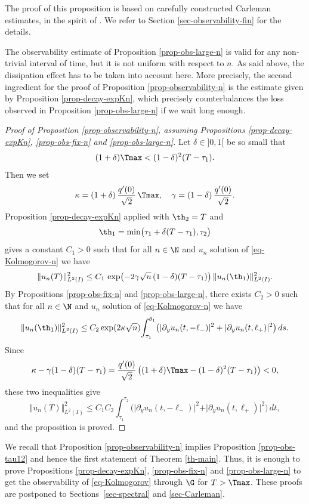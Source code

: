 The proof of this proposition is based on carefully constructed Carleman estimates, in the spirit of \cite{Beauchard_Darde_Ervedoza}. We refer to Section \ref{sec-observability-fin} for the details.

The observability estimate of Proposition \ref{prop-obs-large-n} is valid for any non-trivial interval of time, but it is not uniform with respect to $n$. As said above, the dissipation effect has to be taken into account here. More precisely, the second ingredient for the proof of Proposition \ref{prop-observability-n} is the estimate given by Proposition \ref{prop-decay-expKn}, which precisely counterbalances the loss observed in Proposition \ref{prop-obs-large-n} if we wait long enough.

\begin{proof}[Proof of Proposition \ref{prop-observability-n}, assuming Propositions \ref{prop-decay-expKn}, \ref{prop-obs-fix-n} and \ref{prop-obs-large-n}]
Let $\delta \in{}]0,1[$ be so small that
\[
(1 +\delta) \Tmax < (1-\delta)^2 (T - \tau_1).
\]
Then we set
\[
\kappa = (1+\delta)\, \frac{q'(0)}{\sqrt{2}}\, \Tmax,
\quad \gamma = (1-\delta)\, \frac{q'(0)}{\sqrt{2}}.
\]
Proposition \ref{prop-decay-expKn} applied with $\th_2 = T$ and
\[
\th_1 = \min\bigl(\tau_1 + \delta (T-\tau_1) , \tau_2 \bigr)
\]
gives a constant $C_1 > 0$ such that for all $n\in \N$ and $u_n$ solution of \eqref{eq-Kolmogorov-n} we have
\[
\Vert u_n (T) \Vert_{L^2(I)}^2 \leq C_1 \, \exp \bigl(-2\gamma \sqrt n\,(1-\delta) (T-\tau_1) \bigr)\, \Vert u_n(\th_1) \Vert_{L^2(I)}^2.
\]
By Propositions \ref{prop-obs-fix-n} and \ref{prop-obs-large-n}, there exists $C_2 > 0$ such that for all $n\in \N$ and $u_n$ solution of \eqref{eq-Kolmogorov-n} we have
\[
\Vert u_n(\th_1) \Vert_{L^2(I)}^2 \leq C_2 \exp(2\kappa \sqrt{n}) {\int_{\tau_1}^{\theta_1}
\bigl(\vert \partial_y u_n(t,-\ell_-)\vert^2 + \vert \partial_y u_n(t,\ell_+) \vert^2 \bigr)\, ds }.
\]
Since
\[
\kappa - \gamma (1-\delta)(T-\tau_1) = \frac{q'(0)}{\sqrt{2}} \left((1+\delta) \Tmax - (1-\delta)^2 (T-\tau_1) \right)< 0,
\]
these two inequalities give
\[
\Vert u_n(T) \Vert_{L^2(I)}^2 \leq C_1C_2 {\int_{\tau_1}^{\tau_2} \bigl(\vert \partial_y u_n(t,-\ell_-)\vert^2 + \vert \partial_y u_n(t,\ell_+) \vert^2 \bigr) \, dt },
\]
and the proposition is proved.
\end{proof}

We recall that Proposition \ref{prop-observability-n} implies Proposition \ref{prop-obs-tau12} and hence the first statement of Theorem \ref{th-main}. Thus, it is enough to prove Propositions \ref{prop-decay-expKn}, \ref{prop-obs-fix-n} and \ref{prop-obs-large-n} to get the observability of \eqref{eq-Kolmogorov} through $\G$ for $T > \Tmax$. These proofs are postponed to Sections~\ref{sec-spectral} and \ref{sec-Carleman}.

